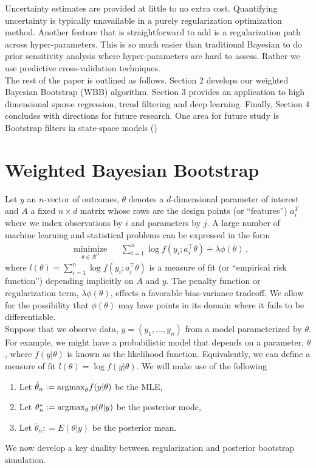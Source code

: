 \documentclass[11pt]{article}%
\newcommand{\R}{\mathcal{R}}
\newcommand{\defeq}{\mathrel{\mathop:}=}
\begin{document}
\noindent Uncertainty estimates are provided at little to no extra cost. Quantifying uncertainty is typically unavailable in a purely regularization optimization method. Another feature that is straightforward to add is a regularization path across hyper-parameters. This is so much easier than traditional Bayesian to do prior sensitivity analysis where hyper-parameters are hard to assess. Rather we use predictive cross-validation techniques.\\

\noindent The rest of the paper is outlined as follows. Section 2 develops our weighted Bayesian Bootstrap (WBB) algorithm. Section 3 provides an application to high dimensional sparse regression, trend filtering and deep learning. Finally, Section 4 concludes with directions for future research. One area for future study is Bootstrap filters in state-space models (\cite{gordon1993novel}) 

\section{Weighted Bayesian Bootstrap}
Let  $y$ an $n$-vector of outcomes, $\theta$ denotes a $d$-dimensional parameter of interest and $A$ a fixed $n \times d$ matrix whose rows are the design points (or ``features'') $a_i^T$
where we index  observations by $i$ and parameters by $j$.  
A large number of machine learning and statistical problems can be expressed in the form
\begin{equation}
\label{eqn:canonicalform}
\begin{aligned}
& \underset{\theta \in \R^d}{\text{minimize}}
& &  \sum_{i=1}^n \log f ( y_i ; a_i^\top \theta ) + \lambda\phi(\theta) \, ,
\end{aligned}
\end{equation}
where $l(\theta) = \sum_{i=1}^n \log f ( y_i ; a_i^\top \theta )$ is a measure of fit (or ``empirical risk function'') depending implicitly on $A$ and $y$.
The penalty function or regularization term, $\lambda\phi(\theta) $,  
effects a favorable bias-variance tradeoff.  We allow for the possibility that $\phi(\theta)$ may have points in its domain where it fails to be differentiable.  \\



\noindent Suppose that we observe data, $y = (y_1 , \ldots , y_n ) $ from a model parameterized by $\theta$. For example, we might have a probabilistic model that depends on a parameter, $\theta$, where $f(y|\theta)$ is known as the likelihood function. Equivalently, we can define a measure of fit $l(\theta) = \log f(y|\theta)$. We will make use of the following
\begin{enumerate}[label=(\roman*)]
\item Let $ \hat{\theta}_n \defeq {\rm arg max}_\theta f(y |\theta) $ be the MLE, 
\item Let $\theta^*_n \defeq {\rm arg max}_\theta \; p( \theta|y) $ be the posterior mode,
\item Let $ \bar{\theta}_n \defeq E(\theta | y) $ be the posterior mean.
\end{enumerate}
We now develop a key duality between regularization and posterior bootstrap simulation.
\end{document}
